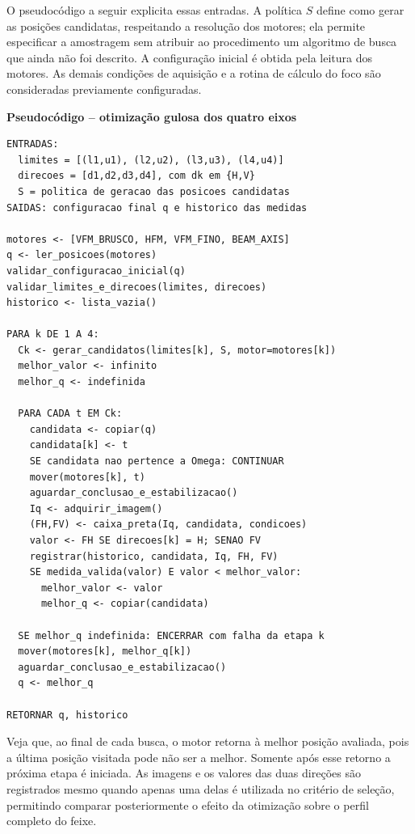 \documentclass[12pt,a4paper]{article}
\begin{document}
O pseudocódigo a seguir explicita essas entradas. A política $S$ define como gerar as posições candidatas, respeitando a resolução dos motores; ela permite especificar a amostragem sem atribuir ao procedimento um algoritmo de busca que ainda não foi descrito. A configuração inicial é obtida pela leitura dos motores. As demais condições de aquisição e a rotina de cálculo do foco são consideradas previamente configuradas.

\par\medskip
\noindent\begin{minipage}{\linewidth}
\textbf{Pseudocódigo -- otimização gulosa dos quatro eixos}
\begin{Verbatim}[fontsize=\footnotesize,frame=single]
ENTRADAS:
  limites = [(l1,u1), (l2,u2), (l3,u3), (l4,u4)]
  direcoes = [d1,d2,d3,d4], com dk em {H,V}
  S = politica de geracao das posicoes candidatas
SAIDAS: configuracao final q e historico das medidas

motores <- [VFM_BRUSCO, HFM, VFM_FINO, BEAM_AXIS]
q <- ler_posicoes(motores)
validar_configuracao_inicial(q)
validar_limites_e_direcoes(limites, direcoes)
historico <- lista_vazia()

PARA k DE 1 A 4:
  Ck <- gerar_candidatos(limites[k], S, motor=motores[k])
  melhor_valor <- infinito
  melhor_q <- indefinida

  PARA CADA t EM Ck:
    candidata <- copiar(q)
    candidata[k] <- t
    SE candidata nao pertence a Omega: CONTINUAR
    mover(motores[k], t)
    aguardar_conclusao_e_estabilizacao()
    Iq <- adquirir_imagem()
    (FH,FV) <- caixa_preta(Iq, candidata, condicoes)
    valor <- FH SE direcoes[k] = H; SENAO FV
    registrar(historico, candidata, Iq, FH, FV)
    SE medida_valida(valor) E valor < melhor_valor:
      melhor_valor <- valor
      melhor_q <- copiar(candidata)

  SE melhor_q indefinida: ENCERRAR com falha da etapa k
  mover(motores[k], melhor_q[k])
  aguardar_conclusao_e_estabilizacao()
  q <- melhor_q

RETORNAR q, historico
\end{Verbatim}
\end{minipage}
\par\medskip

Veja que, ao final de cada busca, o motor retorna à melhor posição avaliada, pois a última posição visitada pode não ser a melhor. Somente após esse retorno a próxima etapa é iniciada. As imagens e os valores das duas direções são registrados mesmo quando apenas uma delas é utilizada no critério de seleção, permitindo comparar posteriormente o efeito da otimização sobre o perfil completo do feixe.
\end{document}
